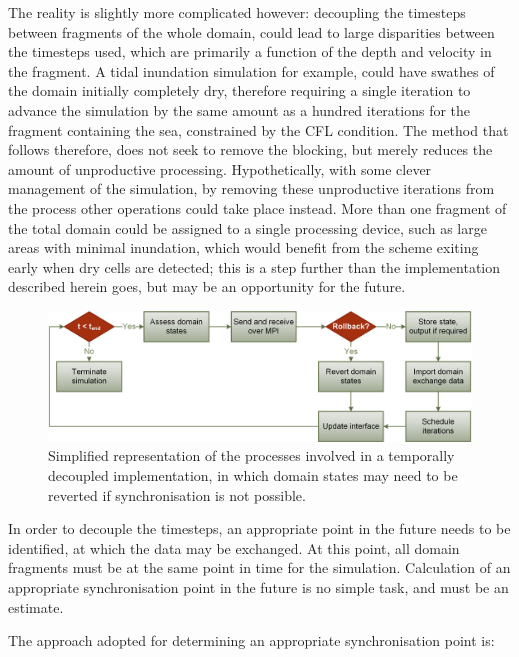 The reality is slightly more complicated however: decoupling the timesteps between fragments of the whole domain, could lead to large disparities between the timesteps used, which are primarily a function of the depth and velocity in the fragment. A tidal inundation simulation for example, could have swathes of the domain initially completely dry, therefore requiring a single iteration to advance the simulation by the same amount as a hundred iterations for the fragment containing the sea, constrained by the CFL condition. The method that follows therefore, does not seek to remove the blocking, but merely reduces the amount of unproductive processing. Hypothetically, with some clever management of the simulation, by removing these unproductive iterations from the process other operations could take place instead. More than one fragment of the total domain could be assigned to a single processing device, such as large areas with minimal inundation, which would benefit from the scheme exiting early when dry cells are detected; this is a step further than the implementation described herein goes, but may be an opportunity for the future.

\begin{figure}[tpb]
	\centering
	\includegraphics[width=1.0\textwidth]{mpi-figures/mpi-flowchart.png}
	\caption{Simplified representation of the processes involved in a temporally decoupled implementation, in which domain states may need to be reverted if synchronisation is not possible.}
	\label{Software_MPI_Flow}
\end{figure}

In order to decouple the timesteps, an appropriate point in the future needs to be identified, at which the data may be exchanged. At this point, all domain fragments must be at the same point in time for the simulation. Calculation of an appropriate synchronisation point in the future is no simple task, and must be an estimate.

The approach adopted for determining an appropriate synchronisation point is:

